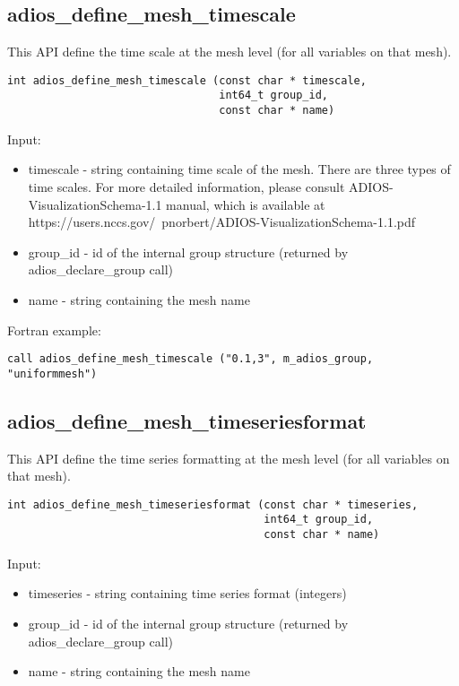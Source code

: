 \subsection{adios\_define\_mesh\_timescale}
This API define the time scale at the mesh level (for all variables on that mesh).

\begin{lstlisting}[alsolanguage=C,caption={},label={}]
int adios_define_mesh_timescale (const char * timescale, 
                                 int64_t group_id, 
                                 const char * name)
\end{lstlisting}

Input:
\begin{itemize}
\item timescale - string containing time scale of the mesh. There are three types of
time scales. For more detailed information, please consult ADIOS-VisualizationSchema-1.1 manual,
which is available at https://users.nccs.gov/~pnorbert/ADIOS-VisualizationSchema-1.1.pdf
\item group\_id - id of the internal group structure (returned by adios\_declare\_group call)
\item name - string containing the mesh name
\end{itemize}

Fortran example:
\begin{lstlisting}[alsolanguage=Fortran,caption={},label={}]
call adios_define_mesh_timescale ("0.1,3", m_adios_group, "uniformmesh")
\end{lstlisting}


\subsection{adios\_define\_mesh\_timeseriesformat}
This API define the time series formatting at the mesh level (for all variables on that mesh).

\begin{lstlisting}[alsolanguage=C,caption={},label={}]
int adios_define_mesh_timeseriesformat (const char * timeseries, 
                                        int64_t group_id, 
                                        const char * name)
\end{lstlisting}

Input:
\begin{itemize}
\item timeseries - string containing time series format (integers)
\item group\_id - id of the internal group structure (returned by adios\_declare\_group call)
\item name - string containing the mesh name
\end{itemize}

